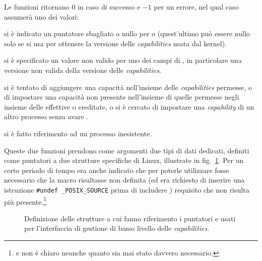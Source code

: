 \begin{funcproto}{
}

{Le funzioni ritornano $0$ in caso di successo e $-1$ per un errore, nel qual
  caso  assumerà uno dei valori: 
  \begin{errlist}
  \item[\errcode{EFAULT}] si è indicato un puntatore sbagliato o nullo
    per  o  (quest'ultimo può essere nullo solo se si
    usa  per ottenere la versione delle \textit{capabilities}
    usata dal kernel).
  \item[\errcode{EINVAL}] si è specificato un valore non valido per uno dei
    campi di , in particolare una versione non valida della
    versione delle \textit{capabilities}.
  \item[\errcode{EPERM}] si è tentato di aggiungere una capacità nell'insieme
    delle \textit{capabilities} permesse, o di impostare una capacità non
    presente nell'insieme di quelle permesse negli insieme delle effettive o
    ereditate, o si è cercato di impostare una \textit{capability} di un altro
    processo senza avare .
  \item[\errcode{ESRCH}] si è fatto riferimento ad un processo inesistente.
  \end{errlist}
}
\end{funcproto}

Queste due funzioni prendono come argomenti due tipi di dati dedicati,
definiti come puntatori a due strutture specifiche di Linux, illustrate in
fig.~\ref{fig:cap_kernel_struct}.  Per un certo periodo di tempo era anche
indicato che per poterle utilizzare fosse necessario che la macro
 risultasse non definita (ed era richiesto di inserire
una istruzione \texttt{\#undef \_POSIX\_SOURCE} prima di includere
) requisito che non risulta più
presente.\footnote{e non è chiaro neanche quanto sia mai stato davvero
  necessario.}

\begin{figure}[!htb]
  \footnotesize
  \centering
  \begin{minipage}[c]{0.8\textwidth}
  \end{minipage}
  \normalsize 
  \caption{Definizione delle strutture a cui fanno riferimento i puntatori
     e  usati per
    l'interfaccia di gestione di basso livello delle \textit{capabilities}.}
  \label{fig:cap_kernel_struct}
\end{figure}

